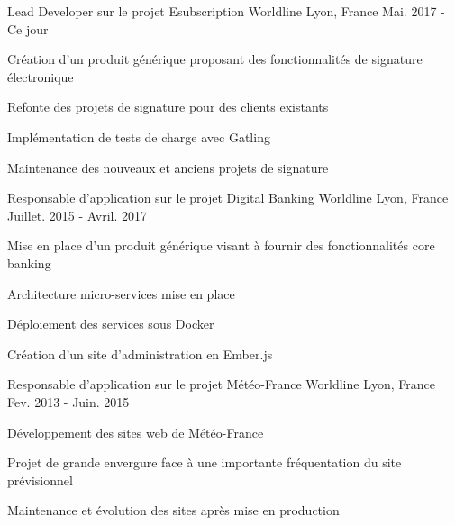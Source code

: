

\begin{cventries}

  \cventry
    {Lead Developer sur le projet Esubscription} %
    {Worldline} %
    {Lyon, France} %
    {Mai. 2017 - Ce jour} %
    {
      \begin{cvitems} %
        \item {Création d'un produit générique proposant des fonctionnalités de signature électronique}
        \item {Refonte des projets de signature pour des clients existants}
        \item {Implémentation de tests de charge avec Gatling}
        \item {Maintenance des nouveaux et anciens projets de signature}
      \end{cvitems}
    }

  \cventry
    {Responsable d'application sur le projet Digital Banking} %
    {Worldline} %
    {Lyon, France} %
    {Juillet. 2015 - Avril. 2017} %
    {
      \begin{cvitems} %
        \item {Mise en place d'un produit générique visant à fournir des fonctionnalités core banking}
        \item {Architecture micro-services mise en place}
        \item {Déploiement des services sous Docker}
        \item {Création d'un site d'administration en Ember.js}
      \end{cvitems}
    }

  \cventry
    {Responsable d'application sur le projet Météo-France} %
    {Worldline} %
    {Lyon, France} %
    {Fev. 2013 - Juin. 2015} %
    {
      \begin{cvitems} %
        \item {Développement des sites web de Météo-France}
        \item {Projet de grande envergure face à une importante fréquentation du site prévisionnel}
        \item {Maintenance et évolution des sites après mise en production}
      \end{cvitems}
    }


\end{cventries}
